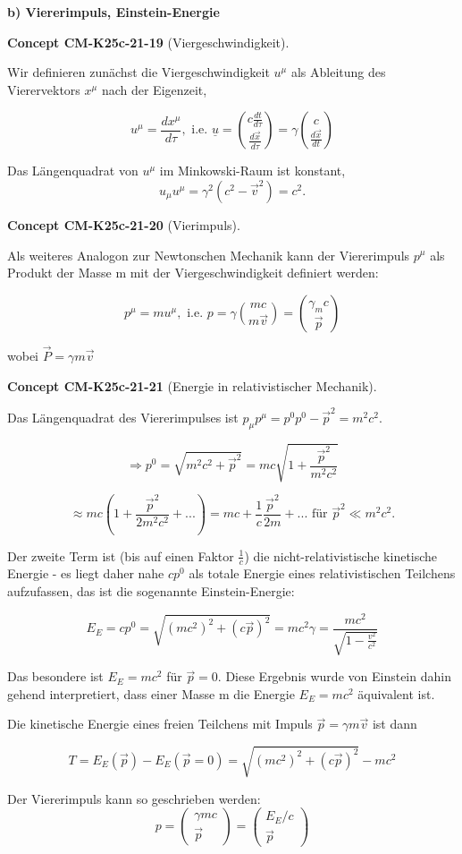 \documentclass[10pt, letterpaper]{article}
\newcommand{\CustomHeading}[3]{%
  \par\medskip\noindent%
  \textbf{#1 #2} \textnormal{(#3)}.\enskip%
}
\newenvironment{CONC}[2]{\begin{unitbox}\CustomHeading{Concept}{#1}{#2}}{\end{unitbox}}
\begin{document}
\textbf{b) Viererimpuls, Einstein-Energie}

\begin{CONC}{CM-K25c-21-19}{Viergeschwindigkeit}
Wir definieren zunächst die Viergeschwindigkeit $u^\mu$ als Ableitung des Vierervektors $x^\mu$ nach der Eigenzeit,

\[u^\mu = \frac{dx^\mu}{d\tau}, \text{ i.e. } \underline{u}=\binom{c \frac{d t}{d \tau}}{\frac{d \vec{x}}{d \tau}}=\gamma\binom{c}{\frac{d \vec{x}}{d t}}\]

Das Längenquadrat von $u^\mu$ im Minkowski-Raum ist konstant,
\[u_\mu u^\mu = \gamma^2(c^2-\vec{v}^2) = c^2.\]
\end{CONC}

\begin{CONC}{CM-K25c-21-20}{Vierimpuls}
Als weiteres Analogon zur Newtonschen Mechanik kann der Viererimpuls $p^\mu$ als Produkt der Masse m mit der Viergeschwindigkeit definiert werden:

\[p^\mu = mu^\mu, \text{ i.e. } p=\gamma\binom{m c}{m \vec{v}}=\binom{\gamma_m c}{\vec{p}}\]

wobei $\vec{P} = \gamma m\vec{v}$
\end{CONC}

\begin{CONC}{CM-K25c-21-21}{Energie in relativistischer Mechanik}
Das Längenquadrat des Viererimpulses ist $p_\mu p^\mu = p^0p^0-\vec{p}^2 = m^2c^2$.

\[\Rightarrow p^0 = \sqrt{m^2c^2 + \vec{p}^2} = mc\sqrt{1+\frac{\vec{p}^2}{m^2c^2}}\]

\[\approx mc\left(1+\frac{\vec{p}^2}{2m^2c^2}+...\right) = mc + \frac{1}{c}\frac{\vec{p}^2}{2m}+... \text{ für } \vec{p}^2 \ll m^2c^2.\]

Der zweite Term ist (bis auf einen Faktor $\frac{1}{c}$) die nicht-relativistische kinetische Energie - es liegt daher nahe $cp^0$ als totale Energie eines relativistischen Teilchens aufzufassen,
das ist die sogenannte Einstein-Energie:

\[E_E = cp^0 = \sqrt{(mc^2)^2 + (c\vec{p})^2} = mc^2\gamma = \frac{mc^2}{\sqrt{1-\frac{v^2}{c^2}}}\]

Das besondere ist $E_E = mc^2$ für $\vec{p}=0$. Diese Ergebnis wurde von Einstein dahin gehend interpretiert, dass einer Masse m die Energie $E_E = mc^2$ äquivalent ist.

Die kinetische Energie eines freien Teilchens mit Impuls $\vec{p}=\gamma m\vec{v}$ ist dann

\[T = E_E(\vec{p}) - E_E(\vec{p}=0) = \sqrt{(mc^2)^2 + (c\vec{p})^2} - mc^2\]

Der Viererimpuls kann so geschrieben werden:
\[p = \begin{pmatrix} \gamma mc \\ \vec{p} \end{pmatrix} = \begin{pmatrix} E_E/c \\ \vec{p} \end{pmatrix}\]
\end{CONC}
\end{document}
